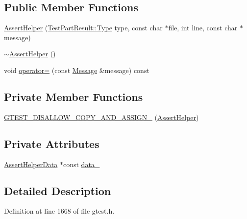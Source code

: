 \subsection*{Public Member Functions}
\begin{DoxyCompactItemize}
\item 
\hyperlink{classtesting_1_1internal_1_1AssertHelper_ac2c9334518fd4087189b4505567a3c90}{Assert\+Helper} (\hyperlink{classtesting_1_1TestPartResult_a65ae656b33fdfdfffaf34858778a52d5}{Test\+Part\+Result\+::\+Type} type, const char $\ast$file, int line, const char $\ast$message)
\item 
\hyperlink{classtesting_1_1internal_1_1AssertHelper_a51c640785d4ed4a0155cc9aa857d8931}{$\sim$\+Assert\+Helper} ()
\item 
void \hyperlink{classtesting_1_1internal_1_1AssertHelper_a97bf22d786131ab7baa86b97a27aeb4d}{operator=} (const \hyperlink{classtesting_1_1Message}{Message} \&message) const
\end{DoxyCompactItemize}
\subsection*{Private Member Functions}
\begin{DoxyCompactItemize}
\item 
\hyperlink{classtesting_1_1internal_1_1AssertHelper_a264544ac41950b296c34253d2e656b10}{G\+T\+E\+S\+T\+\_\+\+D\+I\+S\+A\+L\+L\+O\+W\+\_\+\+C\+O\+P\+Y\+\_\+\+A\+N\+D\+\_\+\+A\+S\+S\+I\+G\+N\+\_\+} (\hyperlink{classtesting_1_1internal_1_1AssertHelper}{Assert\+Helper})
\end{DoxyCompactItemize}
\subsection*{Private Attributes}
\begin{DoxyCompactItemize}
\item 
\hyperlink{structtesting_1_1internal_1_1AssertHelper_1_1AssertHelperData}{Assert\+Helper\+Data} $\ast$const \hyperlink{classtesting_1_1internal_1_1AssertHelper_af69a4d66a929d0c6e419f4efd3ba6b3a}{data\+\_\+}
\end{DoxyCompactItemize}


\subsection{Detailed Description}


Definition at line 1668 of file gtest.\+h.



